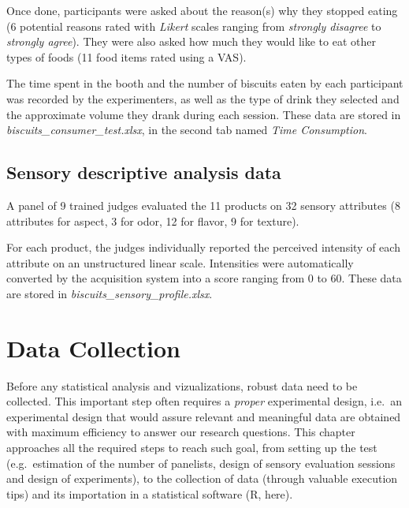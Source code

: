 \documentclass[
]{krantz}
\renewenvironment{quote}{\begin{VF}}{\end{VF}}
\begin{document}
Once done, participants were asked about the reason(s) why they stopped eating (6 potential reasons rated with \emph{Likert} scales ranging from \emph{strongly disagree} to \emph{strongly agree}). They were also asked how much they would like to eat other types of foods (11 food items rated using a VAS).

The time spent in the booth and the number of biscuits eaten by each participant was recorded by the experimenters, as well as the type of drink they selected and the approximate volume they drank during each session. These data are stored in \emph{biscuits\_consumer\_test.xlsx}, in the second tab named \emph{Time Consumption}.

\hypertarget{sensory-descriptive-analysis-data}{%
\section{Sensory descriptive analysis data}\label{sensory-descriptive-analysis-data}}

A panel of 9 trained judges evaluated the 11 products on 32 sensory attributes (8 attributes for aspect, 3 for odor, 12 for flavor, 9 for texture).

For each product, the judges individually reported the perceived intensity of each attribute on an unstructured linear scale. Intensities were automatically converted by the acquisition system into a score ranging from 0 to 60. These data are stored in \emph{biscuits\_sensory\_profile.xlsx}.

\hypertarget{data-collection}{%
\chapter{Data Collection}\label{data-collection}}

\begin{quote}
Before any statistical analysis and vizualizations, robust data need to be collected. This important step often requires a \emph{proper} experimental design, i.e.~an experimental design that would assure relevant and meaningful data are obtained with maximum efficiency to answer our research questions. This chapter approaches all the required steps to reach such goal, from setting up the test (e.g.~estimation of the number of panelists, design of sensory evaluation sessions and design of experiments), to the collection of data (through valuable execution tips) and its importation in a statistical software (R, here).
\end{quote}
\end{document}
